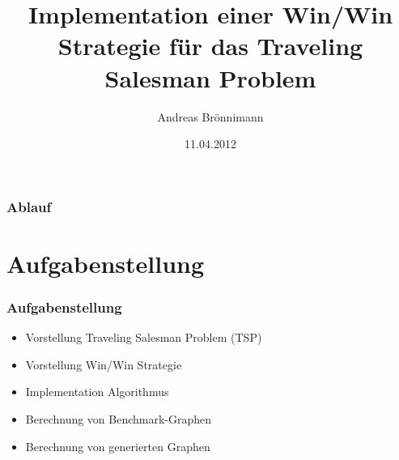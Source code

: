 \documentclass[12pt]{beamer}
\title[Semesterarbeit]{Implementation einer Win/Win Strategie für das Traveling Salesman Problem}
\author{Andreas Brönnimann}
\institute{ZHAW - Zürcher Hochschule für Angewandte Wissenschaften}
\date{11.04.2012}
\begin{document}
    \begin{frame}
        \titlepage
    \end{frame}

    \begin{frame}
        \frametitle{Ablauf}
        \tableofcontents
    \end{frame}

    \section{Aufgabenstellung}
    \begin{frame}
        \frametitle{Aufgabenstellung}
	    \begin{itemize}
                \item Vorstellung Traveling Salesman Problem (TSP) 
                \item Vorstellung Win/Win Strategie
                \item Implementation Algorithmus
                \item Berechnung von Benchmark-Graphen
                \item Berechnung von generierten Graphen
            \end{itemize}
    \end{frame}
\end{document}
